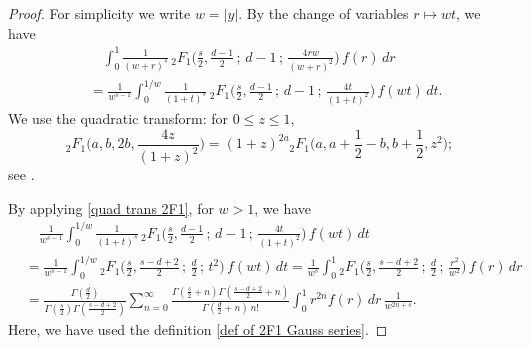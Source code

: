 \documentclass[10pt]{amsart}
\theoremstyle{plain}
\theoremstyle{remark}
\numberwithin{equation}{section}
\begin{document}
\begin{proof}
For simplicity we write $w=|y|.$
By the change of variables $r \mapsto w t$, we have 
\begin{align*}
&\quad  \int_{ 0 }^1    \frac{1}{(w+r)^s}    \, {}_2F_1\Big(  \frac{s}{2}, \frac{d-1}{2} \, ; \, d-1 \, ; \,   \frac{4rw}{(w+r)^2} \Big)\, f(r) \,dr 
\\
& =  \frac{1}{w^{s-1}}  \int_0^{1/w}  \frac{1}{(1+ t)^s}    \, {}_2F_1\Big(  \frac{s}{2}, \frac{d-1}{2} \, ; \, d-1 \, ; \,   \frac{4t}{(1+ t)^2} \Big)\, f(wt)  \,dt.
\end{align*}
We use the quadratic transform: for $0\le z \le 1$,
\begin{equation} \label{quad trans 2F1}
{}_2F_1 \Big( a,b,2b, \frac{4z}{(1+z)^2} \Big) = (1+z)^{2a} {}_2F_1\Big( a,a+\frac12-b, b+\frac12, z^2 \Big); 
\end{equation}
see \cite[Eq.2.11(5)]{Bateman53}. 

By applying \eqref{quad trans 2F1}, for $w>1$, we have 
\begin{align*}
&\quad \frac{1}{w^{s-1}}  \int_0^{1/w}  \frac{1}{(1+ t)^s}    \, {}_2F_1\Big(  \frac{s}{2}, \frac{d-1}2 \, ; \, d-1 \, ; \,   \frac{4t}{(1+ t)^2} \Big)\, f(wt)  \,dt 
\\
&= \frac{1}{w^{s-1}}  \int_0^{1/w}  {}_2F_1\Big(  \frac{s}{2}, \frac{s-d+2}{2} \, ; \, \frac{d}{2} \, ; \,   t^2 \Big)\, f(wt)  \,dt
= \frac{1}{w^{s}}  \int_0^{1}  {}_2F_1\Big(  \frac{s}{2}, \frac{s-d+2}{2} \, ; \, \frac{d}{2}\, ; \,   \frac{r^2}{w^2} \Big)\, f(r)  \,dr 
\\
&=   \frac{ \Gamma( \frac{d}{2} ) }{ \Gamma(\frac{s}{2}) \Gamma( \frac{s-d+2}{2} )  }    \sum_{n=0}^\infty \frac{ \Gamma(\frac{s}{2}+n) \Gamma( \frac{s-d+2}{2}+n )  }{ \Gamma(\frac{d}{2}+n) \, n! } \int_0^1   r^{ 2n }  f(r)\,dr\, \frac{1}{w^{2n+s}}. 
\end{align*}
Here, we have used the definition \eqref{def of 2F1 Gauss series}.  


\end{proof}
\end{document}
